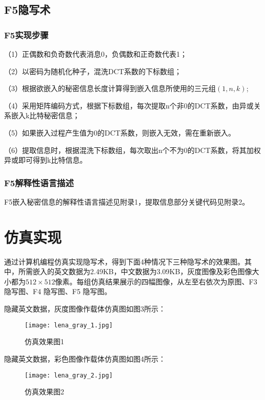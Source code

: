 \documentclass[onecolumn,a4paper,12pt]{article}
\begin{document}
\subsection{F5隐写术}

\subsubsection{F5实现步骤}

（1）正偶数和负奇数代表消息0，负偶数和正奇数代表1；

（2）以密码为随机化种子，混洗DCT系数的下标数组；

（3）根据欲嵌入的秘密信息长度计算得到嵌入信息所使用的三元组$(1,n,k)$;

（4）采用矩阵编码方式，根据下标数组，每次提取n个非0的DCT系数，由异或关系嵌入k比特秘密信息；

（5）如果嵌入过程产生值为0的DCT系数，则嵌入无效，需在重新嵌入。

（6）提取信息时，根据混洗下标数组，每次取出n个不为0的DCT系数，将其加权异或即可得到k比特信息。

\subsubsection{F5解释性语言描述}

F5嵌入秘密信息的解释性语言描述见附录1，提取信息部分关键代码见附录2。

\section{仿真实现}

通过计算机编程仿真实现隐写术，得到下面4种情况下三种隐写术的效果图。其中，所需嵌入的英文数据为2.49KB，中文数据为3.09KB，灰度图像及彩色图像大小都为$512\times512$像素。每组仿真结果展示的四幅图像，从左至右依次为原图、F3 隐写图、F4 隐写图、F5 隐写图。

隐藏英文数据，灰度图像作载体仿真图如图3所示：
\begin{figure}[H]
  \centering
  \texttt{[image: lena\_gray\_1.jpg]}\\
  \caption{仿真效果图1}\label{仿真效果图1}
\end{figure}

隐藏英文数据，彩色图像作载体仿真图如图4所示：
\begin{figure}[H]
  \centering
  \texttt{[image: lena\_gray\_2.jpg]}\\
  \caption{仿真效果图2}\label{仿真效果图2}
\end{figure}
\end{document}
